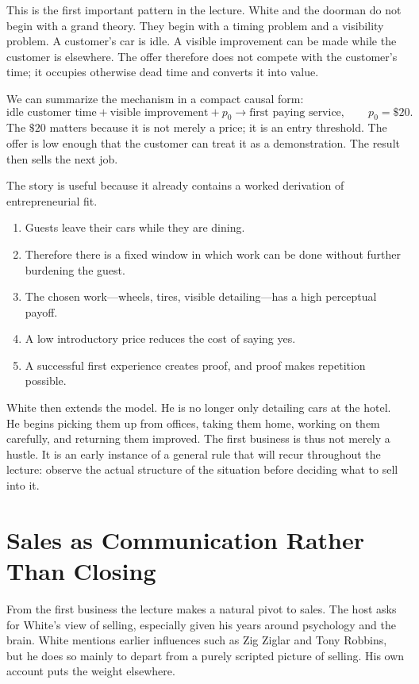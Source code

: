 This is the first important pattern in the lecture. White and the doorman do not begin with a grand theory. They begin with a timing problem and a visibility problem. A customer's car is idle. A visible improvement can be made while the customer is elsewhere. The offer therefore does not compete with the customer's time; it occupies otherwise dead time and converts it into value.

We can summarize the mechanism in a compact causal form:
\begin{equation}
\text{idle customer time}+\text{visible improvement}+p_0
\to
\text{first paying service},
\qquad
p_0=\text{\$20}.
\end{equation}
The \(\$20\) matters because it is not merely a price; it is an entry threshold. The offer is low enough that the customer can treat it as a demonstration. The result then sells the next job.

The story is useful because it already contains a worked derivation of entrepreneurial fit.
\begin{enumerate}
\item Guests leave their cars while they are dining.
\item Therefore there is a fixed window in which work can be done without further burdening the guest.
\item The chosen work---wheels, tires, visible detailing---has a high perceptual payoff.
\item A low introductory price reduces the cost of saying yes.
\item A successful first experience creates proof, and proof makes repetition possible.
\end{enumerate}
White then extends the model. He is no longer only detailing cars at the hotel. He begins picking them up from offices, taking them home, working on them carefully, and returning them improved. The first business is thus not merely a hustle. It is an early instance of a general rule that will recur throughout the lecture: observe the actual structure of the situation before deciding what to sell into it.

\section{Sales as Communication Rather Than Closing}

From the first business the lecture makes a natural pivot to sales. The host asks for White's view of selling, especially given his years around psychology and the brain. White mentions earlier influences such as Zig Ziglar and Tony Robbins, but he does so mainly to depart from a purely scripted picture of selling. His own account puts the weight elsewhere.


